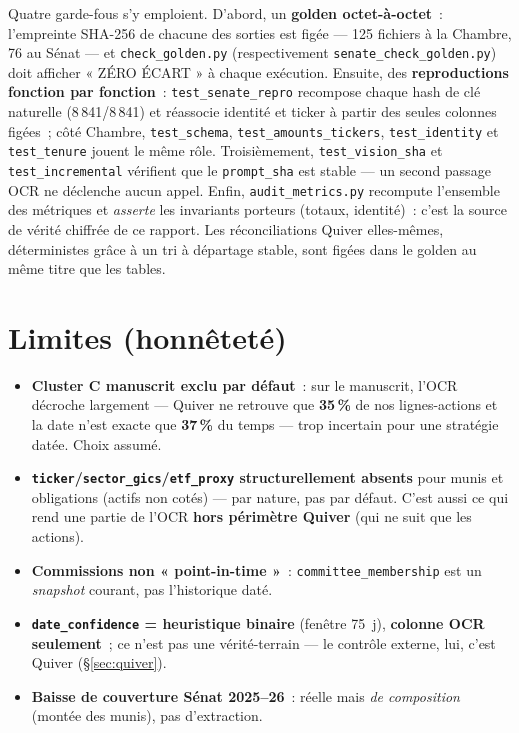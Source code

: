 \documentclass[11pt,a4paper]{article}
\newcommand{\co}[1]{\texttt{\small #1}}
\begin{document}
Quatre garde-fous s'y emploient. D'abord, un \textbf{golden octet-à-octet}~: l'empreinte SHA-256 de chacune
des sorties est figée — 125 fichiers à la Chambre, 76 au Sénat — et \co{check_golden.py} (respectivement
\co{senate_check_golden.py}) doit afficher « ZÉRO ÉCART » à chaque exécution. Ensuite, des
\textbf{reproductions fonction par fonction}~: \co{test_senate_repro} recompose chaque hash de clé naturelle
(8\,841/8\,841) et réassocie identité et ticker à partir des seules colonnes figées~; côté Chambre,
\co{test_schema}, \co{test_amounts_tickers}, \co{test_identity} et \co{test_tenure} jouent le même rôle.
Troisièmement, \co{test_vision_sha} et \co{test_incremental} vérifient que le \co{prompt_sha} est stable —
un second passage OCR ne déclenche aucun appel. Enfin, \co{audit_metrics.py} recompute l'ensemble des
métriques et \emph{asserte} les invariants porteurs (totaux, identité)~: c'est la source de vérité chiffrée
de ce rapport. Les réconciliations Quiver elles-mêmes, déterministes grâce à un tri à départage stable, sont
figées dans le golden au même titre que les tables.

\section{Limites (honnêteté)}
\label{sec:limites}
\begin{itemize}[nosep,leftmargin=1.5em]
\item \textbf{Cluster C manuscrit exclu par défaut}~: sur le manuscrit, l'OCR décroche largement — Quiver
ne retrouve que \textbf{35\,\%} de nos lignes-actions et la date n'est exacte que \textbf{37\,\%} du temps —
trop incertain pour une stratégie datée. Choix assumé.
\item \textbf{\co{ticker}/\co{sector_gics}/\co{etf_proxy} structurellement absents} pour munis et
obligations (actifs non cotés) — par nature, pas par défaut. C'est aussi ce qui rend une partie de l'OCR
\textbf{hors périmètre Quiver} (qui ne suit que les actions).
\item \textbf{Commissions non « point-in-time »}~: \co{committee_membership} est un \emph{snapshot}
courant, pas l'historique daté.
\item \textbf{\co{date_confidence} = heuristique binaire} (fenêtre 75~j), \textbf{colonne OCR seulement}~;
ce n'est pas une vérité-terrain — le contrôle externe, lui, c'est Quiver (§\ref{sec:quiver}).
\item \textbf{Baisse de couverture Sénat 2025--26}~: réelle mais \emph{de composition} (montée des munis),
pas d'extraction.
\end{itemize}
\end{document}
